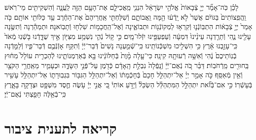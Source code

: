 \documentclass[twoside, openany, parskip=half, 11pt]{book}
\begin{document}
\begin{footnotesize}
\begin{multicols}{2}
לָכֵ֗ן כֹּֽה־אָמַ֞ר יְיָ֤ צְֿבָאוֹת֙ אֱלֹהֵ֣י יִשְׂרָאֵ֔ל הִנְנִ֧י מַֽאֲכִילָ֛ם אֶת־הָעָ֥ם הַזֶּ֖ה לַֽעֲנָ֑ה וְֿהִשְׁקִיתִ֖ים מֵי־רֹֽאשׁ׃ וַֽהֲפִֽצוֹתִים֙ בַּגּוֹיִ֔ם אֲשֶׁר֙ לֹ֣א יָֽדְֿע֔וּ הֵ֖מָּה וַֽאֲבוֹתָ֑ם וְֿשִׁלַּחְתִּ֤י אַֽחֲרֵיהֶם֙ אֶת־הַחֶ֔רֶב עַ֥ד כַּלּוֹתִ֖י אוֹתָֽם׃ כֹּ֤ה אָמַר֙ יְיָ֣ צְֿבָא֔וֹת הִתְבּֽוֹנְֿנ֛וּ וְֿקִרְא֥וּ לַמְקוֹנְֿנ֖וֹת וּתְבוֹאֶ֑ינָה וְֿאֶל־הַֽחֲכָמ֥וֹת שִׁלְח֖וּ וְֿתָבֽוֹאנָה׃ וּתְמַהֵ֕רְנָה וְֿתִשֶּׂ֥נָה עָלֵ֖ינוּ נֶ֑הִי וְֿתֵרַ֤דְנָה עֵינֵ֨ינוּ֙ דִּמְעָ֔ה וְֿעַפְעַפֵּ֖ינוּ יִזְּֿלוּ־מָֽיִם׃ כִּ֣י ק֥וֹל נְֿהִ֛י נִשְׁמַ֥ע מִצִּיּ֖וֹן אֵ֣יךְ שֻׁדָּ֑דְֿנוּ בֹּ֤שְֿׁנֽוּ מְֿאֹד֙ כִּֽי־עָזַ֣בְנוּ אָ֔רֶץ כִּ֥י הִשְׁלִ֖יכוּ מִשְׁכְּֿנוֹתֵֽינוּ׃ כִּֽי־שְֿׁמַ֤עְנָה נָשִׁים֙ דְּֿבַר־יְֿיָ֔ וְֿתִקַּ֥ח אָזְֿנְֿכֶ֖ם דְּֿבַר־פִּ֑יו וְֿלַמֵּ֤דְֿנָה בְֿנֽוֹתֵיכֶם֙ נֶ֔הִי וְֿאִשָּׁ֥ה רְֿעוּתָ֖הּ קִינָֽה׃ כִּי־עָ֤לָה מָ֨וֶת֙ בְּֿחַלּוֹנֵ֔ינוּ בָּ֖א בְּֿאַרְמְנוֹתֵ֑ינוּ לְֿהַכְרִ֤ית עוֹלָל֙ מִח֔וּץ בַּֽחוּרִ֖ים מֵֽרְֿחֹבֽוֹת׃ דַּבֵּ֗ר כֹּ֚ה נְֿאֻם־יְֿיָ֔ וְֿנָֽפְֿלָה֙ נִבְלַ֣ת הָֽאָדָ֔ם כְּֿדֹ֖מֶן עַל־פְּֿנֵ֣י הַשָּׂדֶ֑ה וּכְעָמִ֛יר מֵאַֽחֲרֵ֥י הַקֹּצֵ֖ר וְֿאֵ֥ין מְֿאַסֵּֽף׃ כֹּ֣ה אָמַ֣ר יְיָ֗ אַל־יִתְהַלֵּ֤ל חָכָם֙ בְּֿחָכְֿמָת֔וֹ וְֿאַל־יִתְהַלֵּ֥ל הַגִּבּ֖וֹר בִּגְבֽוּרָת֑וֹ אַל־יִתְהַלֵּ֥ל עָשִׁ֖יר בְּֿעָשְֿׁרֽוֹ׃ כִּ֣י אִם־בְּֿזֹ֞את יִתְהַלֵּ֣ל הַמִּתְהַלֵּ֗ל הַשְׂכֵּל֘ וְֿיָדֹ֣עַ אוֹתִי֒ כִּ֚י אֲנִ֣י יְיָ֔ עֹ֥שֶׂה חֶ֛סֶד מִשְׁפָּ֥ט וּצְדָקָ֖ה בָּאָ֑רֶץ כִּֽי־בְֿאֵ֥לֶּה חָפַ֖צְתִּי נְֿאֻם־יְֿיָ׃

\end{multicols}

\section[תענית ציבור]{קריאה לתענית ציבור}\label{torah taanis tzibbur}



\end{footnotesize}
\end{document}
